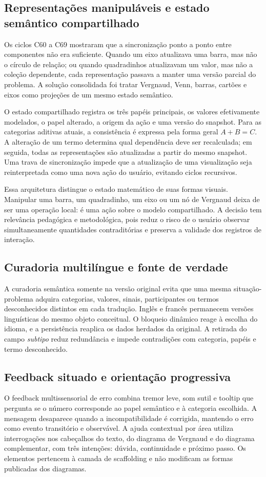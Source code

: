 \documentclass[preprint,12pt,authoryear]{elsarticle}
\begin{document}
\subsection{Representações manipuláveis e estado semântico compartilhado}
Os ciclos C60 a C69 mostraram que a sincronização ponto a ponto entre componentes não era suficiente. Quando um eixo atualizava uma barra, mas não o círculo de relação; ou quando quadradinhos atualizavam um valor, mas não a coleção dependente, cada representação passava a manter uma versão parcial do problema. A solução consolidada foi tratar Vergnaud, Venn, barras, cartões e eixos como projeções de um mesmo estado semântico.

O estado compartilhado registra os três papéis principais, os valores efetivamente modelados, o papel alterado, a origem da ação e uma versão do snapshot. Para as categorias aditivas atuais, a consistência é expressa pela forma geral $A+B=C$. A alteração de um termo determina qual dependência deve ser recalculada; em seguida, todas as representações são atualizadas a partir do mesmo snapshot. Uma trava de sincronização impede que a atualização de uma visualização seja reinterpretada como uma nova ação do usuário, evitando ciclos recursivos.

Essa arquitetura distingue o estado matemático de suas formas visuais. Manipular uma barra, um quadradinho, um eixo ou um nó de Vergnaud deixa de ser uma operação local: é uma ação sobre o modelo compartilhado. A decisão tem relevância pedagógica e metodológica, pois reduz o risco de o usuário observar simultaneamente quantidades contraditórias e preserva a validade dos registros de interação.

\subsection{Curadoria multilíngue e fonte de verdade}
A curadoria semântica somente na versão original evita que uma mesma situação-problema adquira categorias, valores, sinais, participantes ou termos desconhecidos distintos em cada tradução. Inglês e francês permanecem versões linguísticas do mesmo objeto conceitual. O bloqueio dinâmico reage à escolha do idioma, e a persistência reaplica os dados herdados da original. A retirada do campo \emph{subtipo} reduz redundância e impede contradições com categoria, papéis e termo desconhecido.

\subsection{Feedback situado e orientação progressiva}
O feedback multissensorial de erro combina tremor leve, som sutil e tooltip que pergunta se o número corresponde ao papel semântico e à categoria escolhida. A mensagem desaparece quando a incompatibilidade é corrigida, mantendo o erro como evento transitório e observável. A ajuda contextual por área utiliza interrogações nos cabeçalhos do texto, do diagrama de Vergnaud e do diagrama complementar, com três intenções: dúvida, continuidade e próximo passo. Os elementos pertencem à camada de scaffolding e não modificam as formas publicadas dos diagramas.
\end{document}
